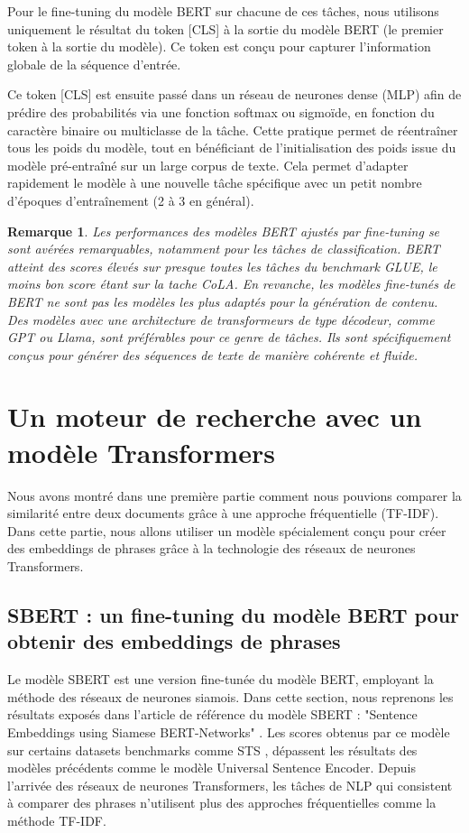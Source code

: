 \documentclass[12pt]{article}
\newtheorem{rmq}{Remarque}
\theoremstyle{definition}
\begin{document}
Pour le fine-tuning du modèle BERT sur chacune de ces tâches, nous utilisons uniquement le résultat du token [CLS] à la sortie du modèle BERT (le premier token à la sortie du modèle). Ce token est conçu pour capturer l'information globale de la séquence d'entrée.

Ce token [CLS] est ensuite passé dans un réseau de neurones dense (MLP) afin de prédire des probabilités via une fonction softmax ou sigmoïde, en fonction du caractère binaire ou multiclasse de la tâche. Cette pratique permet de réentraîner tous les poids du modèle, tout en bénéficiant de l’initialisation des poids issue du modèle pré-entraîné sur un large corpus de texte. Cela permet d'adapter rapidement le modèle à une nouvelle tâche spécifique avec un petit nombre d'époques d'entraînement (2 à 3 en général).

\begin{rmq}
	Les performances des modèles BERT ajustés par fine-tuning se sont avérées remarquables, notamment pour les tâches de classification. BERT atteint des scores élevés sur presque toutes les tâches du benchmark GLUE, le moins bon score étant sur la tache CoLA. En revanche, les modèles fine-tunés de BERT ne sont pas les modèles les plus adaptés pour la génération de contenu. Des modèles avec une architecture de transformeurs de type décodeur, comme GPT ou Llama, sont préférables pour ce genre de tâches. Ils sont spécifiquement conçus pour générer des séquences de texte de manière cohérente et fluide.
\end{rmq}

\section{Un moteur de recherche avec un modèle Transformers}

Nous avons montré dans une première partie comment nous pouvions comparer la similarité entre deux documents grâce à une approche fréquentielle (TF-IDF). Dans cette partie, nous allons utiliser un modèle spécialement conçu pour créer des embeddings de phrases grâce à la technologie des réseaux de neurones Transformers.

\subsection{SBERT : un fine-tuning du modèle BERT pour obtenir des embeddings de phrases}

Le modèle SBERT est une version fine-tunée du modèle BERT, employant la méthode des réseaux de neurones siamois. Dans cette section, nous reprenons les résultats exposés dans l'article de référence du modèle SBERT : "Sentence Embeddings using Siamese BERT-Networks" \cite{sbert}. Les scores obtenus par ce modèle sur certains datasets benchmarks comme STS \cite{sts}, dépassent les résultats des modèles précédents comme le modèle Universal Sentence Encoder. Depuis l'arrivée des réseaux de neurones Transformers, les tâches de NLP qui consistent à comparer des phrases n'utilisent plus des approches fréquentielles comme la méthode TF-IDF.
\end{document}

